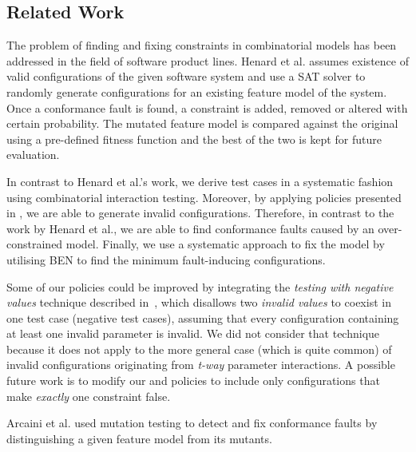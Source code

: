 \begin{tikzborder}{\cite{Gargantini16:validation}}
\begin{tikzborder}{\cite{gargantini_combinatorial_2017}}
\begin{figure}[h]
\end{figure}



\subsection{Related Work}
\label{sec:constr_relatedwork}

\bb The problem of finding and fixing constraints in combinatorial models has been addressed in the field of software product lines. Henard et al. \cite{henard_towards_2013} assumes existence of valid configurations of the given software system and use a SAT solver to randomly generate configurations for an existing feature model of the system. Once a conformance fault is found, a constraint is added, removed or altered with certain probability. The mutated feature model is compared against the original using a pre-defined fitness function and the best of the two is kept for future evaluation. 

In contrast to Henard et al.'s work, we derive test cases in a systematic fashion using combinatorial interaction testing. Moreover, by applying policies presented in \cite{Gargantini16:validation}, we are able to generate invalid configurations. Therefore, in contrast to the work by Henard et al., we are able to find conformance faults caused by an over-constrained model. Finally, we use a systematic approach to fix the model by utilising BEN to find the minimum fault-inducing configurations.

Some of our policies could be improved by integrating the \emph{testing with negative values} technique described in~\cite{czerwonka2006pairwise}, which disallows two \emph{invalid values} to coexist in one test case (negative test cases), assuming that every configuration containing at least one invalid parameter is invalid. We did not consider that technique because it does not apply to the more general case (which is quite common) of invalid configurations originating from \emph{t-way} parameter interactions. A possible future work is to modify our \cv and \ValC policies to include only configurations that make \emph{exactly} one constraint false.

Arcaini et al. \cite{icst2016} used mutation testing to detect and fix conformance faults by distinguishing a given feature model from its mutants. \be



\end{tikzborder}
\end{tikzborder}

